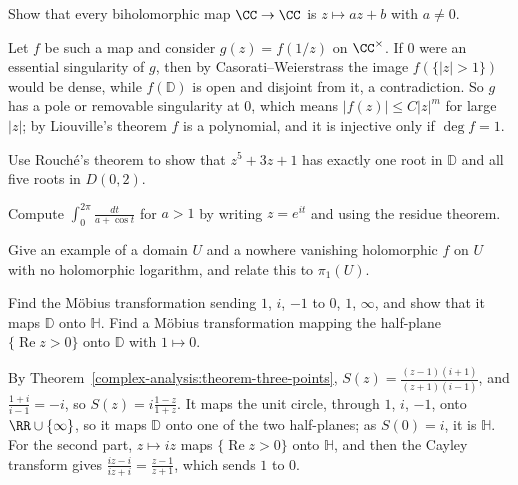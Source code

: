 \begin{exercise}\label{complex-analysis:exercise-automorphisms-plane}
Show that every biholomorphic map $\CC \to \CC$ is $z \mapsto az + b$ with $a \neq 0$.
\end{exercise}

\begin{solution}
Let $f$ be such a map and consider $g(z) = f(1/z)$ on $\CC^\times$. If $0$ were an essential singularity of $g$, then by Casorati--Weierstrass the image $f(\{|z| > 1\})$ would be dense, while $f(\mathbb{D})$
is open and disjoint from it, a contradiction. So $g$ has a pole or removable singularity at $0$, which means $|f(z)| \leq C|z|^m$ for large $|z|$; by Liouville's theorem $f$ is a polynomial, and it is
injective only if $\deg f = 1$.
\end{solution}

\begin{exercise}\label{complex-analysis:exercise-rouche-roots}
Use Rouch\'e's theorem to show that $z^5 + 3z + 1$ has exactly one root in $\mathbb{D}$ and all five roots in $D(0, 2)$.
\end{exercise}

\begin{exercise}\label{complex-analysis:exercise-residue-trigonometric}
Compute $\int_0^{2\pi}\frac{dt}{a + \cos t}$ for $a > 1$ by writing $z = e^{it}$ and using the residue theorem.
\end{exercise}

\begin{exercise}\label{complex-analysis:exercise-cauchy-not-converse}
Give an example of a domain $U$ and a nowhere vanishing holomorphic $f$ on $U$ with no holomorphic logarithm, and relate this to $\pi_1(U)$.
\end{exercise}

\begin{exercise}\label{complex-analysis:exercise-mobius-disc-half-plane}
Find the M\"obius transformation sending $1$, $i$, $-1$ to $0$, $1$, $\infty$, and show that it maps $\mathbb{D}$ onto $\mathbb{H}$. Find a M\"obius transformation mapping the half-plane $\{\operatorname{Re}z > 0\}$ onto $\mathbb{D}$
with $1 \mapsto 0$.
\end{exercise}

\begin{solution}
By Theorem~\ref{complex-analysis:theorem-three-points}, $S(z) = \frac{(z - 1)(i + 1)}{(z + 1)(i - 1)}$, and $\frac{1 + i}{i - 1} = -i$, so $S(z) = i\frac{1 - z}{1 + z}$. It maps the unit circle, through $1$, $i$, $-1$, onto
$\RR \cup \{\infty\}$, so it maps $\mathbb{D}$ onto one of the two half-planes; as $S(0) = i$, it is $\mathbb{H}$. For the second part, $z \mapsto iz$ maps $\{\operatorname{Re}z > 0\}$ onto $\mathbb{H}$, and then the Cayley
transform gives $\frac{iz - i}{iz + i} = \frac{z - 1}{z + 1}$, which sends $1$ to $0$.
\end{solution}

